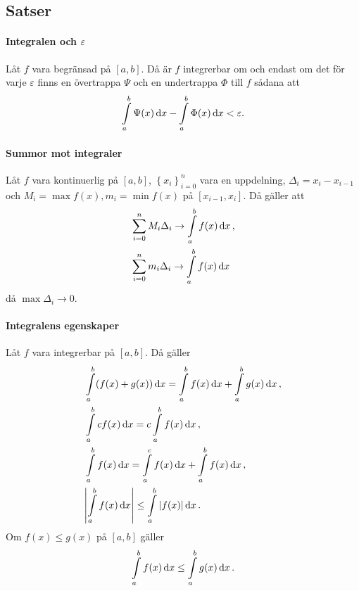 \subsection{Satser}

\paragraph{Integralen och $\varepsilon$}
Låt $f$ vara begränsad på $[a, b]$. Då är $f$ integrerbar om och endast om det för varje $\varepsilon$ finns en övertrappa $\Psi$ och en undertrappa $\Phi$ till $f$ sådana att
\begin{align*}
	\int\limits_{a}^{b}\Psi(x)\dd{x} - \int\limits_{a}^{b}\Phi(x)\dd{x} < \varepsilon.
\end{align*}

\proof

\paragraph{Summor mot integraler}
Låt $f$ vara kontinuerlig på $[a, b]$, $\left\{x_i\right\}_{i = 0}^n$ vara en uppdelning, $\Delta_i = x_i - x_{i - 1}$ och $M_i = \max{f(x)}, m_i = \min{f(x)}$ på $[x_{i - 1}, x_i]$. Då gäller att
\begin{align*}
	&\sum\limits_{i = 0}^n M_i\Delta_i\to\int\limits_{a}^{b}f(x)\dd{x}, \\
	&\sum\limits_{i = 0}^n m_i\Delta_i\to\int\limits_{a}^{b}f(x)\dd{x}
\end{align*}
då $\max{\Delta_i}\to 0$.

\proof

\paragraph{Integralens egenskaper}
Låt $f$ vara integrerbar på $[a, b]$. Då gäller
\begin{align*}
	&\int\limits_{a}^{b}(f(x) + g(x))\dd{x} = \int\limits_{a}^{b}f(x)\dd{x} + \int\limits_{a}^{b}g(x)\dd{x}, \\
	&\int\limits_{a}^{b}cf(x)\dd{x} = c\int\limits_{a}^{b}f(x)\dd{x}, \\
	&\int\limits_{a}^{b}f(x)\dd{x} = \int\limits_{a}^{c}f(x)\dd{x} + \int\limits_{a}^{b}f(x)\dd{x}, \\
	&\abs{\int\limits_{a}^{b}f(x)\dd{x}}\leq \int\limits_{a}^{b}\abs{f(x)}\dd{x}.
\end{align*}
Om $f(x)\leq g(x)$ på $[a, b]$ gäller
\begin{align*}
	\int\limits_{a}^{b}f(x)\dd{x}\leq \int\limits_{a}^{b}g(x)\dd{x}.
\end{align*}

